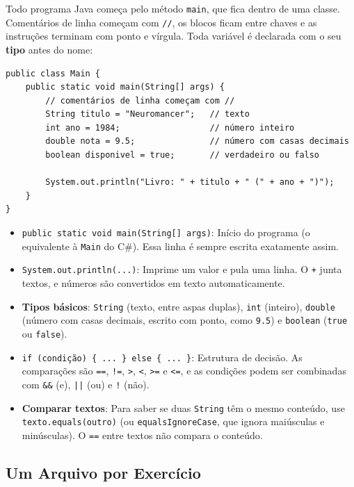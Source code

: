 Todo programa Java começa pelo método \texttt{main}, que fica dentro de uma classe. Comentários
de linha começam com \texttt{//}, os blocos ficam entre chaves e as instruções terminam com
ponto e vírgula. Toda variável é declarada com o seu \textbf{tipo} antes do nome:

\begin{lstlisting}[style=java]
public class Main {
    public static void main(String[] args) {
        // comentários de linha começam com //
        String titulo = "Neuromancer";   // texto
        int ano = 1984;                  // número inteiro
        double nota = 9.5;               // número com casas decimais
        boolean disponivel = true;       // verdadeiro ou falso

        System.out.println("Livro: " + titulo + " (" + ano + ")");
    }
}
\end{lstlisting}

\begin{itemize}
    \item \texttt{public static void main(String[] args)}: Início do programa (o equivalente
    à \texttt{Main} do C\#). Essa linha é sempre escrita exatamente assim.

    \item \texttt{System.out.println(...)}: Imprime um valor e pula uma linha. O \texttt{+} junta
    textos, e números são convertidos em texto automaticamente.

    \item \textbf{Tipos básicos}: \texttt{String} (texto, entre aspas duplas), \texttt{int}
    (inteiro), \texttt{double} (número com casas decimais, escrito com ponto, como
    \texttt{9.5}) e \texttt{boolean} (\texttt{true} ou \texttt{false}).

    \item \texttt{if (condição) \{ ... \} else \{ ... \}}: Estrutura de decisão. As comparações
    são \texttt{==}, \texttt{!=}, \texttt{>}, \texttt{<}, \texttt{>=} e \texttt{<=}, e as
    condições podem ser combinadas com \texttt{\&\&} (e), \texttt{||} (ou) e \texttt{!} (não).

    \item \textbf{Comparar textos}: Para saber se duas \texttt{String} têm o mesmo conteúdo, use
    \texttt{texto.equals(outro)} (ou \texttt{equalsIgnoreCase}, que ignora maiúsculas e
    minúsculas). O \texttt{==} entre textos não compara o conteúdo.
\end{itemize}

\subsection{Um Arquivo por Exercício}

